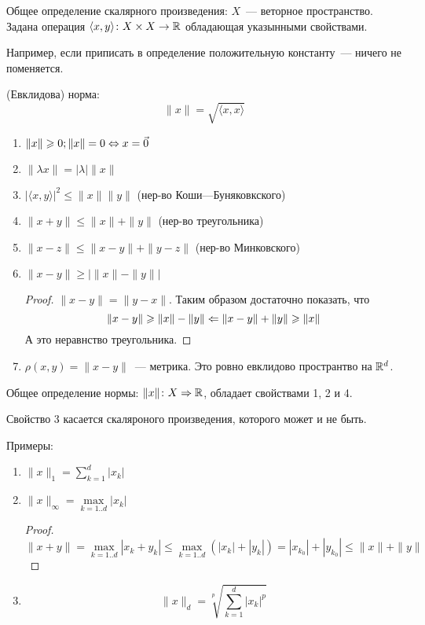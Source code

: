 \begin{Def}
Общее определение скалярного произведения: $X$~--- веторное пространство. Задана операция $\langle x,y\rangle\colon X \times X \rightarrow \mathbb{R}$ обладающая указынными свойствами.
\end{Def}
Например, если приписать в определение положительную константу~--- ничего не поменяется.

\begin{Def}
(Евклидова) норма:
$$\|x\| = \sqrt{\langle x, x\rangle}$$
\end{Def}
\begin{enumerate}
\item $\|x\| \geqslant 0; \|x\| = 0 \Leftrightarrow x = \vec 0$
\item $\|\lambda x\| = |\lambda| \|x\|$
\item $|\langle x,y\rangle|^2 \leqslant \|x\|\|y\|$ (нер-во Коши---Буняковкского)
\item $\|x + y\| \leqslant \|x\| + \|y\|$ (нер-во треугольника)
\item $\|x - z\| \leqslant \|x - y\| + \|y - z\|$ (нер-во Минковского)
\item $\|x - y\| \geqslant \left|\|x\| - \|y\|\right|$
\begin{proof}
$\|x - y\| = \|y - x\|$. Таким образом достаточно показать, что 
$$\|x - y\| \geqslant \|x\| - \|y\| \Leftarrow \|x - y\| + \|y\| \geqslant \|x\|$$
А это неравнство треугольника.
\end{proof}
\item $\rho(x, y) = \|x - y\|$~--- метрика. Это ровно евклидово пространтво на $\mathbb{R}^d$.
\end{enumerate}

\begin{Def}
Общее определение нормы: $\|x\|\colon X \Rightarrow \mathbb{R}$, обладает свойствами 1, 2 и 4.
\end{Def}
Свойство 3 касается скаляроного произведения, которого может и не быть.

Примеры:~%
\begin{enumerate}
\item $\|x\|_1 = \sum\limits_{k=1}^d |x_k|$
\item $\|x\|_\infty = \max\limits_{k=1..d} |x_k|$
\begin{proof}
$$\|x + y\| = \max_{k=1..d} |x_k + y_k| \leqslant \max_{k=1..d} (|x_k| + |y_k|) = |x_{k_0}| + |y_{k_0}| \leqslant \|x\| + \|y\|$$
\end{proof}
\item $$\|x\|_d = \sqrt[p]{\sum\limits_{k=1}^d |x_k|^p}$$
\end{enumerate}
